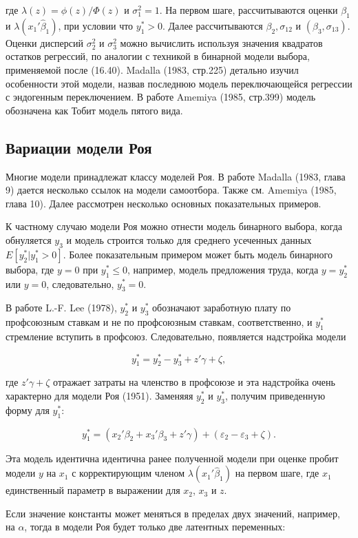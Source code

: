 где $\lambda(z)=\phi(z)/\Phi(z)$ и $\sigma_1^{2}=1$. На первом шаге, рассчитываются оценки $\beta_1$ и $\lambda(x_1'\hat{\beta}_1)$, при условии что $y_1^{*}>0$. Далее рассчитываются $\beta_2, \sigma_{12}$ и $(\beta_3,\sigma_{13})$. Оценки дисперсий $\sigma_2^2$ и $\sigma_3^2$ можно вычислить используя значения квадратов остатков регрессий, по аналогии с техникой в бинарной модели выбора, применяемой после (16.40). Madalla (1983, стр.225) детально изучил особенности этой модели, назвав последнюю модель переключающейся регрессии с эндогенным переключением. В работе Amemiya (1985, стр.399) модель обозначена как Тобит модель пятого вида.

\subsection{Вариации модели Роя}

Многие модели принадлежат классу моделей Роя. В работе Madalla (1983, глава 9) дается несколько ссылок  на модели самоотбора. Также см. Amemiya (1985, глава 10). Далее рассмотрен несколько основных показательных примеров.

К частному случаю модели Роя можно отнести модель бинарного выбора, когда обнуляется $y_3$ и модель строится только для среднего усеченных данных $E[y_2^{*}|y_1^{*}>0]$. Более показательным примером может быть модель бинарного выбора, где $y=0$ при $y_1^{*}{\leq}0$, например, модель предложения труда, когда $y=y_2^{*}$ или $y=0$, следовательно, $y_3^{*}=0$.

В работе L.-F. Lee (1978), $y_2^{*}$ и $y_3^{*}$ обозначают заработную плату по профсоюзным ставкам и не по профсоюзным ставкам, соответственно, и $y_1^{*}$ стремление вступить в профсоюз. Следовательно, появляется надстройка модели

\[
y_1^{*}=y_2^{*}-y_3^{*}+z'\gamma+\zeta,
\]

где $z'\gamma+\zeta$ отражает затраты на членство в профсоюзе и эта надстройка очень характерно для модели Роя (1951). Заменяяя $y_2^{*}$ и $y_3^{*}$, получим приведенную форму для $y_1^{*}$:

\[
y_1^{*}=(x_2'\beta_2+x_3'\beta_3+z'\gamma)+(\varepsilon_2-\varepsilon_3+\zeta).
\]

Эта модель идентична идентична ранее полученной модели при оценке пробит модели $y$ на $x_1$ с корректирующим членом $\lambda(x_1'\hat{\beta}_1)$ на первом шаге, где $x_1$ единственный параметр в выражении для $x_2$, $x_3$ и $z$.

Если значение константы может меняться в пределах двух значений, например, на $\alpha$, тогда в модели Роя будет только две латентных переменных:

